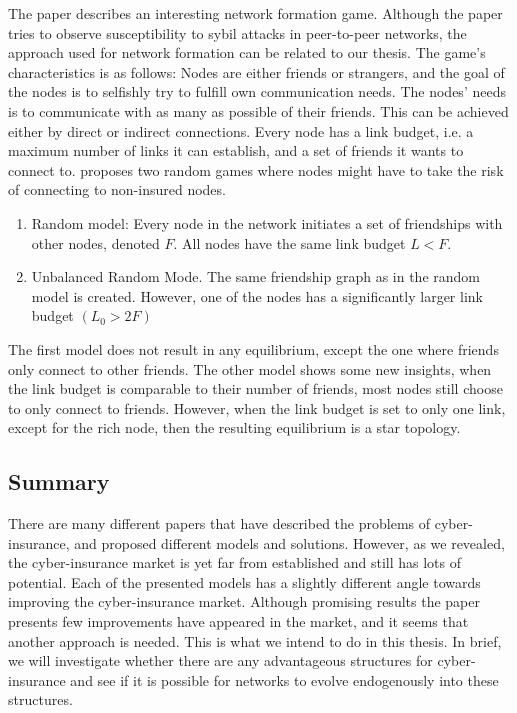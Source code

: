 The paper \cite{danezis2006network} describes an interesting network formation game. Although the paper tries to observe susceptibility to sybil attacks in peer-to-peer networks, the approach used for network formation can be related to our thesis. The game's characteristics is as follows: Nodes are either friends or strangers, and the goal of the nodes is to selfishly try to fulfill own communication needs. The nodes' needs is to communicate with as many as possible of their friends. This can be achieved either by direct or indirect connections. Every node has a link budget, i.e. a maximum number of links it can establish, and a set of friends it wants to connect to. 
\cite{danezis2006network} proposes two random games where nodes might have to take the risk of connecting to non-insured nodes.
\begin{enumerate}
\item Random model: Every node in the network initiates a set of friendships with other nodes, denoted $F$. All nodes have the same link budget $L<F$. 
\item Unbalanced Random Mode. The same friendship graph as in the random model is created. However, one of the nodes has a significantly larger link budget $(L_{0} > 2 F)$
\end{enumerate}
The first model does not result in any equilibrium, except the one where friends only connect to other friends.
The other model shows some new insights, when the link budget is comparable to their number of friends, most nodes still choose to only connect to friends. However, when the link budget is set to only one link, except for the rich node, then the resulting equilibrium is a star topology. 

\subsection{Summary}
There are many different papers that have described the problems of cyber-insurance, and proposed different models and solutions. However, as we revealed, the cyber-insurance market is yet far from established and still has lots of potential. Each of the presented models has a slightly different angle towards improving the cyber-insurance market. Although promising results the paper presents few improvements have appeared in the market, and it seems that another approach is needed. This is what we intend to do in this thesis. In brief, we will investigate whether there are any advantageous structures for cyber-insurance and see if it is possible for networks to evolve endogenously into these structures.  

